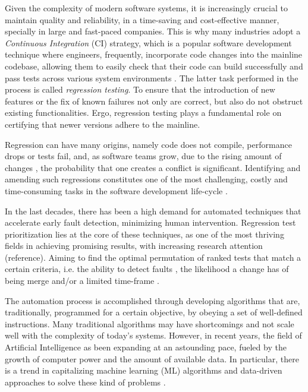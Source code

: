 Given the complexity of modern software systems, it is increasingly crucial to maintain quality and reliability, in a time-saving and cost-effective manner, specially in large and fast-paced companies. This is why many industries adopt a \textit{Continuous Integration} (CI) strategy, which is a popular software development technique where engineers, frequently, incorporate code changes into the mainline codebase, allowing them to easily check that their code can build successfully and pass tests across various system environments \cite{santolucito2018statically} . The latter task performed in the process is called \textit{regression testing}. To ensure that the introduction of new features or the fix of known failures not only are correct, but also do not obstruct existing functionalities. Ergo, regression testing plays a fundamental role on certifying that newer versions adhere to the mainline.  
\par Regression can have many origins, namely code does not compile, performance drops or tests fail, and, as software teams grow, due to the rising amount of changes , the probability that one  creates a conflict is significant. Identifying and amending such regressions constitutes one of the most challenging, costly and time-consuming tasks in the software development life-cycle \cite{Ziftci}.
\par In the last decades, there has been a high demand for automated techniques that accelerate early fault detection, minimizing human intervention. Regression test prioritization lies at the core of these techniques, as one of the most thriving fields in achieving promising results, with increasing research attention (reference). Aiming to find the optimal permutation of ranked tests that match a certain criteria, i.e. the ability to detect faults , the likelihood a change has of being merge and/or a limited time-frame  \cite{palma}. 
\par The automation process is accomplished through developing algorithms that are, traditionally, programmed for a certain objective, by obeying a set of well-defined instructions. Many traditional algorithms may have shortcomings and not scale well with the complexity of today's systems. However, in recent years, the field of Artificial Intelligence as been expanding at an astounding pace, fueled by the growth of computer power and the amount of available data. In particular, there is a trend in capitalizing machine learning (ML) algorithms and data-driven approaches to solve these kind of problems  \cite{durelli} . 
